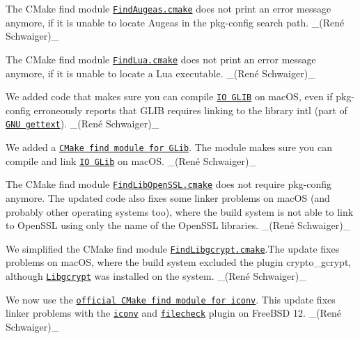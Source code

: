 \begin{DoxyItemize}
\item The C\+Make find module \href{https://master.libelektra.org/scripts/cmake/Modules/FindAugeas.cmake}{\tt {\ttfamily Find\+Augeas.\+cmake}} does not print an error message anymore, if it is unable to locate Augeas in the {\ttfamily pkg-\/config} search path. \+\_\+(René Schwaiger)\+\_\+
\item The C\+Make find module \href{https://master.libelektra.org/scripts/cmake/Modules/FindLua.cmake}{\tt {\ttfamily Find\+Lua.\+cmake}} does not print an error message anymore, if it is unable to locate a Lua executable. \+\_\+(René Schwaiger)\+\_\+
\item We added code that makes sure you can compile \href{https://www.libelektra.org/bindings/io_glib}{\tt IO G\+L\+IB} on mac\+OS, even if {\ttfamily pkg-\/config} erroneously reports that G\+L\+IB requires linking to the library {\ttfamily intl} (part of \href{https://www.gnu.org/software/gettext}{\tt G\+NU gettext}). \+\_\+(René Schwaiger)\+\_\+
\item We added a \href{https://master.libelektra.org/scripts/cmake/Modules/FindGLib.cmake}{\tt C\+Make find module for G\+Lib}. The module makes sure you can compile and link \href{https://www.libelektra.org/bindings/io_glib}{\tt IO G\+Lib} on mac\+OS. \+\_\+(René Schwaiger)\+\_\+
\item The C\+Make find module \href{https://master.libelektra.org/scripts/cmake/Modules/FindLibOpenSSL.cmake}{\tt {\ttfamily Find\+Lib\+Open\+S\+S\+L.\+cmake}} does not require {\ttfamily pkg-\/config} anymore. The updated code also fixes some linker problems on mac\+OS (and probably other operating systems too), where the build system is not able to link to Open\+S\+SL using only the name of the Open\+S\+SL libraries. \+\_\+(René Schwaiger)\+\_\+
\item We simplified the C\+Make find module \href{https://master.libelektra.org/scripts/cmake/Modules/FindLibgcrypt.cmake}{\tt {\ttfamily Find\+Libgcrypt.\+cmake}}.The update fixes problems on mac\+OS, where the build system excluded the plugin {\ttfamily crypto\+\_\+gcrypt}, although \href{https://gnupg.org/software/libgcrypt}{\tt Libgcrypt} was installed on the system. \+\_\+(René Schwaiger)\+\_\+
\item We now use the \href{https://github.com/Kitware/CMake/blob/master/Modules/FindIconv.cmake}{\tt official C\+Make find module for {\ttfamily iconv}}. This update fixes linker problems with the \href{http://libelektra.org/plugins/iconv}{\tt {\ttfamily iconv}} and \href{http://libelektra.org/plugins/filecheck}{\tt {\ttfamily filecheck}} plugin on Free\+B\+SD 12. \+\_\+(René Schwaiger)\+\_\+

\end{DoxyItemize}
